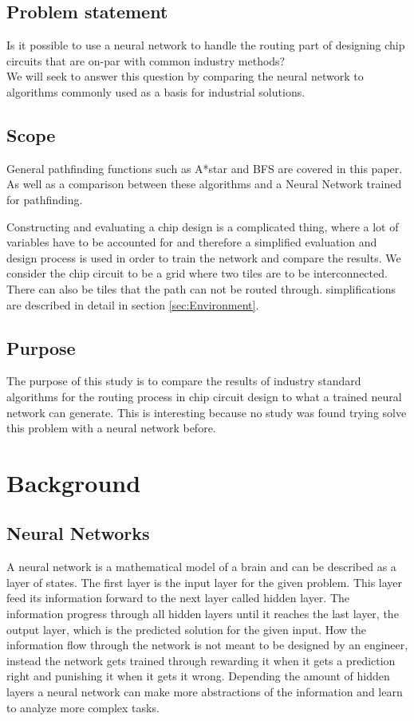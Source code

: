 \documentclass{kththesis}
\begin{document}
\section{Problem statement}
Is it possible to use a neural network to handle the routing part of designing chip circuits that are on-par with common industry methods?\\
 
We will seek to answer this question by comparing the neural network to algorithms commonly used as a basis for industrial solutions.
 
 
\section{Scope}
General pathfinding functions such as A*star and BFS are covered in this paper. As well as a comparison between these algorithms and a Neural Network trained for pathfinding. 
 
Constructing and evaluating a chip design is a complicated thing, where a lot of variables have to be accounted for and therefore a simplified evaluation and design process is used in order to train the network and compare the results. We consider the chip circuit to be a grid where two tiles are to be interconnected. There can also be tiles that the path can not be routed through. simplifications are described in detail in section \ref{sec:Environment}.
 
\section{Purpose}
The purpose of this study is to compare the results of industry standard algorithms for the routing process in chip circuit design to what a trained neural network can generate. This is interesting because no study was found trying solve this problem with a neural network before.
 
\chapter{Background}
 
\section{Neural Networks}
A neural network is a mathematical model of a brain and can be described as a layer of states. The first layer is the input layer for the given problem. This layer feed its information forward to the next layer called hidden layer. The information progress through all hidden layers until it reaches the last layer, the output layer, which is the predicted solution for the given input. How the information flow through the network is not meant to be designed by an engineer, instead the network gets trained through rewarding it when it gets a prediction right and punishing it when it gets it wrong. Depending the amount of hidden layers a neural network can make more abstractions of the information and learn to analyze more complex tasks.
 
\end{document}
